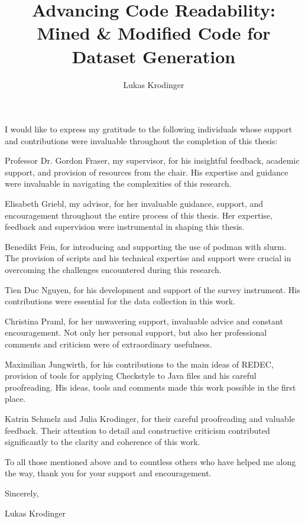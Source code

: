 \documentclass[%
class=scrreprt,
chapterprefix=false,%
open=right,%
twoside=false,%
paper=a4,%
logofile={Logo\_zentral\_farbig\_EN.png},%
thesistype=master,%
UKenglish,%
]{se2thesis}
\author{Lukas Krodinger}
\title{Advancing Code Readability: Mined \& Modified Code for Dataset Generation}
\institute{Chair of Software Engineering II}
\theoremstyle{definition}
\begin{document}
	
	\frontmatter
	
	\maketitle
	
	\begin{acknowledgements}
		I would like to express my gratitude to the following individuals whose support and contributions were invaluable throughout the completion of this thesis:
		
		Professor Dr. Gordon Fraser, my supervisor, for his insightful feedback, academic support, and provision of resources from the chair. His expertise and guidance were invaluable in navigating the complexities of this research.
		
		Elisabeth Griebl, my advisor, for her invaluable guidance, support, and encouragement throughout the entire process of this thesis. Her expertise, feedback and supervision were instrumental in shaping this thesis.
		
		Benedikt Fein, for introducing and supporting the use of podman with slurm. The provision of scripts and his technical expertise and support were crucial in overcoming the challenges encountered during this research.
		
		Tien Duc Nguyen, for his development and support of the survey instrument. His contributions were essential for the data collection in this work.
		
		Christina Praml, for her unwavering support, invaluable advice and constant encouragement. Not only her personal support, but also her professional comments and criticism were of extraordinary usefulness.
		
		Maximilian Jungwirth, for his contributions to the main ideas of REDEC, provision of tools for applying Checkstyle to Java files and his careful proofreading. His ideas, tools and comments made this work possible in the first place.
			
		Katrin Schmelz and Julia Krodinger, for their careful proofreading and valuable feedback. Their attention to detail and constructive criticism contributed significantly to the clarity and coherence of this work.
		
		To all those mentioned above and to countless others who have helped me along the way, thank you for your support and encouragement.
		
		Sincerely,

		Lukas Krodinger
	\end{acknowledgements}
	
\end{document}
